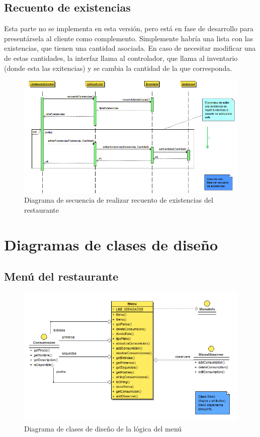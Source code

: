 \documentclass[spanish,a4paper,11pt, twoside]{report}	%
\begin{document}
		\subsection{Recuento de existencias}
		Esta parte no se implementa en esta versión, pero está en fase de desarrollo para presentársela al cliente como complemento. Simplemente habría una lista con las existencias, que tienen una cantidad asociada. En caso de necesitar modificar una de estas cantidades, la interfaz llama al controlador, que llama al inventario (donde esta las exitencias) y se cambia la cantidad de la que corresponda.
		\begin{figure}[!h]
		\centering
		\includegraphics[scale=0.5]{DSexistencias.png}
		\caption{Diagrama de secuencia de realizar recuento de existencias del restaurante}
		\end{figure}



	\section{Diagramas de clases de diseño}
		\subsection{Menú del restaurante}
		\begin{figure}[!h]
		\centering
		\includegraphics[scale=0.5]{DCDmenu.png}
		\caption{Diagrama de clases de diseño de la lógica del menú}
		\end{figure}
\end{document}
